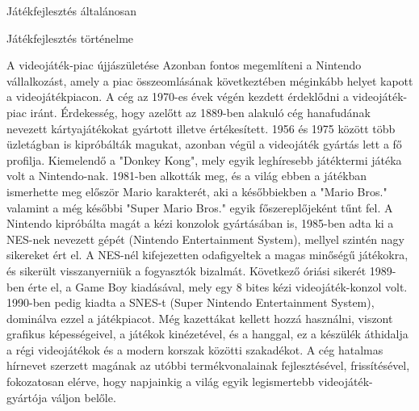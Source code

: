 \begin{MyChapter}{Játékfejlesztés általánosan}
\begin{MySection}{Játékfejlesztés történelme}
		\begin{MySubSection}{A videojáték-piac újjászületése}
			Azonban fontos megemlíteni a Nintendo vállalkozást, amely a piac összeomlásának következtében méginkább helyet kapott a videojátékpiacon. A cég az 1970-es évek végén kezdett érdeklődni a videojáték-piac iránt. Érdekesség, hogy azelőtt az 1889-ben alakuló cég hanafudának nevezett kártyajátékokat gyártott illetve értékesített. 1956 és 1975 között több üzletágban is kipróbálták magukat, azonban végül a videojáték gyártás lett a fő profilja. Kiemelendő a "Donkey Kong", mely egyik leghíresebb játéktermi játéka volt a Nintendo-nak. 1981-ben alkották meg, és a világ ebben a játékban ismerhette meg először Mario karakterét, aki a későbbiekben a "Mario Bros." valamint a még későbbi "Super Mario Bros." egyik főszereplőjeként tűnt fel. A Nintendo kipróbálta magát a kézi konzolok gyártásában is, 1985-ben adta ki a NES-nek nevezett gépét (Nintendo Entertainment System), mellyel szintén nagy sikereket ért el. A NES-nél kifejezetten odafigyeltek a magas minőségű játékokra, és sikerült visszanyerniük a fogyasztók bizalmát. Következő óriási sikerét 1989-ben érte el, a Game Boy kiadásával, mely egy 8 bites kézi videojáték-konzol volt. 1990-ben pedig kiadta a SNES-t (Super Nintendo Entertainment System), dominálva ezzel a játékpiacot. Még kazettákat kellett hozzá használni, viszont grafikus képességeivel, a játékok kinézetével, és a hanggal, ez a készülék áthidalja a régi videojátékok és a modern korszak közötti szakadékot. A cég hatalmas hírnevet szerzett magának az utóbbi termékvonalainak fejlesztésével, frissítésével, fokozatosan elérve, hogy napjainkig a világ egyik legismertebb videojáték-gyártója váljon belőle.
			
			
		

\end{MySubSection}
\end{MySection}
\end{MyChapter}
